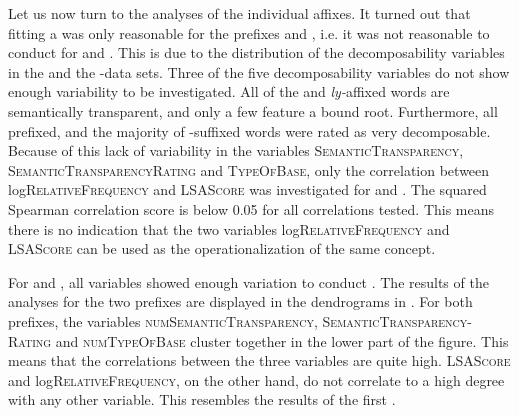  
 Let us now turn to the analyses of the individual affixes.
 It turned out that fitting a  was only reasonable for the prefixes  and , i.e. it was not reasonable to conduct  for  and . 
 This is due to the distribution of the decomposability variables in the  and the -data sets. Three of the five decomposability variables do not show enough variability to be investigated. All of the  and \textit{ly-}affixed words are semantically transparent, and only a few feature a bound root. Furthermore, all prefixed, and the majority of -suffixed words were rated as very decomposable. Because of this lack of variability in the variables \textsc{SemanticTransparency}, \textsc{SemanticTransparencyRating} and \textsc{TypeOfBase}, only the correlation between log\textsc{RelativeFrequency} and \textsc{LSAScore} was investigated for  and .
 The squared Spearman correlation score is below 0.05 for all correlations tested. This means there is no indication that the two variables log\textsc{RelativeFrequency} and \textsc{LSAScore} can be used as the operationalization of the same concept.
 
 
 
 
 
 For  and , all variables showed enough variation to conduct . The results of the analyses for the two prefixes are displayed in the dendrograms in . 
 For both prefixes, the variables \textsc{numSemanticTransparency}, \textsc{SemanticTransparency-Rating} and \textsc{numTypeOfBase} cluster together in the lower part of the figure. This means that the correlations between the three variables are quite high. \textsc{LSAScore} and log\textsc{RelativeFrequency}, on the other hand, do not correlate to a high degree with any other variable. This resembles the results of the first .


